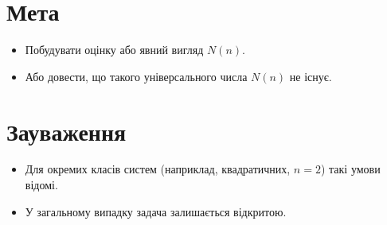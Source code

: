 \documentclass[a4paper,12pt]{article}
\begin{document}
\section*{Мета}

\begin{itemize}
\item Побудувати оцінку або явний вигляд $N(n)$.
\item Або довести, що такого універсального числа $N(n)$ не існує.
\end{itemize}

\section*{Зауваження}

\begin{itemize}
\item Для окремих класів систем (наприклад, квадратичних, $n=2$) такі умови відомі.
\item У загальному випадку задача залишається відкритою.
\end{itemize}
\end{document}
